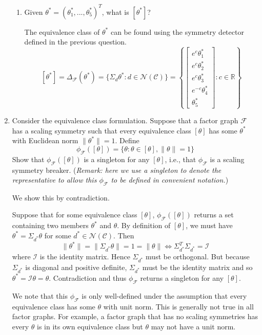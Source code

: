 \begin{enumerate}
\begin{enumerate}
\item
Given $\theta^*=(\theta_1^*,...,\theta_5^*)^T$, what is $[\theta^*]$?

\begin{solution}
The equivalence class of $\theta^*$ can be found using the symmetry detector defined in the previous question.
\[
[\theta^*] = \Delta_\mathcal{F}(\theta^*) = \{\Sigma_d\theta^*:d\in\mathcal{N}(\mathcal{C})\} = \left\{
\begin{bmatrix}
e^c\theta_1^* \\
e^c\theta_2^* \\
e^c\theta_3^* \\
e^{-c}\theta_4^* \\
\theta_5^*
\end{bmatrix}
:
c\in\mathbb{R}
\right\}
\]
\end{solution}

\end{enumerate}

\item
Consider the equivalence class formulation. Suppose that a factor graph $\mathcal{F}$ has a scaling symmetry such that every equivalence class $[\theta]$ has some $\theta^*$ with Euclidean norm $\|\theta^*\|=1$. Define
\[
\phi_\mathcal{F}([\theta])=\{\theta:\theta\in[\theta],\|\theta\|=1\}
\]
Show that $\phi_\mathcal{F}([\theta])$ is a singleton for any $[\theta]$, i.e., that $\phi_\mathcal{F}$ is a scaling symmetry breaker. (\textit{Remark: here we use a singleton to denote the representative to allow this $\phi_\mathcal{F}$ to be defined in convenient notation.})

\begin{solution}
We show this by contradiction.

Suppose that for some equivalence class $[\theta]$, $\phi_\mathcal{F}([\theta])$ returns a set containing two members $\theta^*$ and $\theta$. By definition of $[\theta]$, we must have $\theta^*=\Sigma_{d^*}\theta$ for some $d^*\in\mathcal{N}(\mathcal{C})$. Then
\[
\|\theta^*\| = \|\Sigma_{d^*}\theta\| = 1 = \|\theta\| \iff \Sigma_{d^*}^T\Sigma_{d^*} = \mathcal{I}
\]
where $\mathcal{I}$ is the identity matrix. Hence $\Sigma_{d^*}$ must be orthogonal. But because $\Sigma_{d^*}$ is diagonal and positive definite, $\Sigma_{d^*}$ must be the identity matrix and so $\theta^*=\mathcal{I}\theta = \theta$. Contradiction and thus $\phi_\mathcal{F}$ returns a singleton for any $[\theta]$.

We note that this $\phi_\mathcal{F}$ is only well-defined under the assumption that every equivalence class has some $\theta$ with unit norm. This is generally not true in all factor graphs. For example, a factor graph that has no scaling symmetries has every $\theta$ is in its own equivalence class but $\theta$ may not have a unit norm.
\end{solution}


\end{enumerate}
